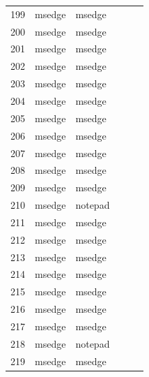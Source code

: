 \documentclass[a4paper,twoside,12pt]{book}
\begin{document}
\begin{appendices}
\begin{table}
\begin{tabular}{l|l|l|l|l|l}
		199 &  msedge &         msedge &                &                &                \\
		200 &  msedge &         msedge &                &                &                \\
		201 &  msedge &         msedge &                &                &                \\
		202 &  msedge &         msedge &                &                &                \\
		203 &  msedge &         msedge &                &                &                \\
		204 &  msedge &         msedge &                &                &                \\
		205 &  msedge &         msedge &                &                &                \\
		206 &  msedge &         msedge &                &                &                \\
		207 &  msedge &         msedge &                &                &                \\
		208 &  msedge &         msedge &                &                &                \\
		209 &  msedge &         msedge &                &                &                \\
		210 &  msedge &        notepad &                &                &                \\
		211 &  msedge &         msedge &                &                &                \\
		212 &  msedge &         msedge &                &                &                \\
		213 &  msedge &         msedge &                &                &                \\
		214 &  msedge &         msedge &                &                &                \\
		215 &  msedge &         msedge &                &                &                \\
		216 &  msedge &         msedge &                &                &                \\
		217 &  msedge &         msedge &                &                &                \\
		218 &  msedge &        notepad &                &                &                \\
		219 &  msedge &         msedge &                &                &                \\

\end{tabular}
\end{table}
\end{appendices}
\end{document}
